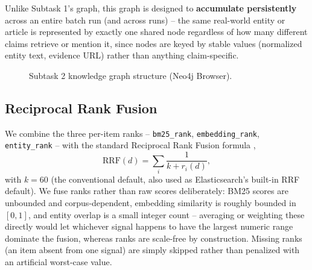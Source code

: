 \documentclass[
]{ceurart}
\begin{document}
Unlike Subtask 1's graph, this graph is designed to \textbf{accumulate
persistently} across an entire batch run (and across runs) -- the same
real-world entity or article is represented by exactly one shared node
regardless of how many different claims retrieve or mention it, since
nodes are keyed by stable values (normalized entity text, evidence URL)
rather than anything claim-specific.

\begin{figure}[h]
  \centering
  \caption{Subtask 2 knowledge graph structure (Neo4j Browser).}
  \label{fig:st2-kg}
\end{figure}

\subsection{Reciprocal Rank Fusion}
\label{sec:st2-rrf}

We combine the three per-item ranks -- \texttt{bm25\_rank},
\texttt{embedding\_rank}, \texttt{entity\_rank} -- with the standard
Reciprocal Rank Fusion formula \cite{cormack2009reciprocal},
\begin{equation}
  \mathrm{RRF}(d) = \sum_{i} \frac{1}{k + r_i(d)},
\end{equation}
with $k = 60$ (the conventional default, also used as Elasticsearch's
built-in RRF default). We fuse ranks rather than raw scores
deliberately: BM25 scores are unbounded and corpus-dependent, embedding
similarity is roughly bounded in $[0, 1]$, and entity overlap is a
small integer count -- averaging or weighting these directly would let
whichever signal happens to have the largest numeric range dominate the
fusion, whereas ranks are scale-free by construction. Missing ranks (an
item absent from one signal) are simply skipped rather than penalized
with an artificial worst-case value.
\end{document}

